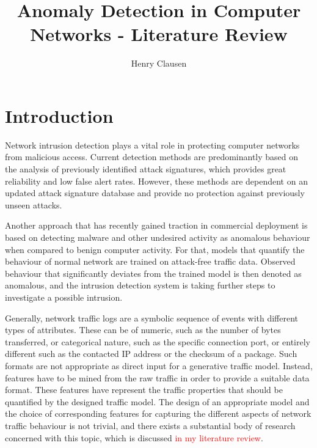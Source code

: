 \documentclass[a4paper,12pt,twoside]{report}
\begin{document}
\title{\LARGE {\bf Anomaly Detection in Computer Networks - Literature Review}\\
 \vspace*{6mm}
}

\author{Henry Clausen}

\maketitle

\section{Introduction}


Network intrusion detection plays a vital role in protecting computer networks from malicious access. Current detection methods are predominantly based on the analysis of previously identified attack signatures, which provides great reliability and low false alert rates. However, these methods are dependent on an updated attack signature database and provide no protection against previously unseen attacks. 

Another approach that has recently gained traction in commercial deployment is based on detecting malware and other undesired activity as anomalous behaviour when compared to benign computer activity. For that, models that quantify the behaviour of normal network are trained on attack-free traffic data. Observed behaviour that significantly deviates from the trained model is then denoted as anomalous, and the intrusion detection system is taking further steps to investigate a possible intrusion. 

Generally, network traffic logs are a symbolic sequence of events with different types of attributes. These can be of numeric, such as the number of bytes transferred, or categorical nature, such as the specific connection port, or entirely different such as the contacted IP address or the checksum of a package. Such formats are not appropriate as direct input for a generative traffic model. Instead, features have to be mined from the raw traffic in order to provide a suitable data format. These features have represent the traffic properties that should be quantified by the designed traffic model. The design of an appropriate model and the choice of corresponding features for capturing the different aspects of network traffic behaviour is not trivial, and there exists a substantial body of research concerned with this topic, which is discussed \textcolor{red}{in my literature review}. 
\end{document}
